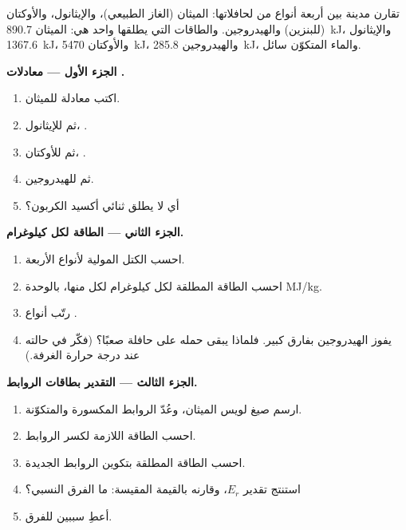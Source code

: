 \begin{problem}
\label{pb:g11:reaction-energy:1}
تقارن مدينة بين أربعة أنواع من  لحافلاتها: الميثان (الغاز الطبيعي)، والإيثانول،
والأوكتان (للبنزين) والهيدروجين. والطاقات التي يطلقها   واحد هي: الميثان \qty{890.7}{kJ}، والإيثانول
\qty{1367.6}{kJ}، والأوكتان \qty{5470}{kJ}، والهيدروجين \qty{285.8}{kJ}،
والماء المتكوّن سائل.

\medskip
\noindent\textbf{الجزء الأول --- معادلات .}
\begin{enumerate}
  \item اكتب معادلة  للميثان.
  \item ثم للإيثانول، .
  \item ثم للأوكتان، .
  \item ثم للهيدروجين.
  \item أي  لا يطلق ثنائي أكسيد الكربون؟
\end{enumerate}

\medskip
\noindent\textbf{الجزء الثاني --- الطاقة لكل كيلوغرام.}
\begin{enumerate}[resume]
  \item احسب الكتل المولية لأنواع  الأربعة.
  \item احسب الطاقة المطلقة لكل كيلوغرام لكل منها، بالوحدة
        \si{MJ/kg}.
  \item رتّب أنواع .
  \item يفوز الهيدروجين بفارق كبير. فلماذا يبقى حمله على
        حافلة صعبًا؟ (فكّر في حالته عند درجة حرارة الغرفة.)
\end{enumerate}

\medskip
\noindent\textbf{الجزء الثالث --- التقدير بطاقات الروابط.}
\begin{enumerate}[resume]
  \item ارسم صيغ لويس  
        الميثان، وعُدّ الروابط المكسورة والمتكوّنة.
  \item احسب الطاقة اللازمة لكسر الروابط.
  \item احسب الطاقة المطلقة بتكوين الروابط الجديدة.
  \item استنتج تقدير $E_r$، وقارنه بالقيمة
        المقيسة: ما الفرق النسبي؟
  \item أعطِ سببين للفرق.
\end{enumerate}


\end{problem}
